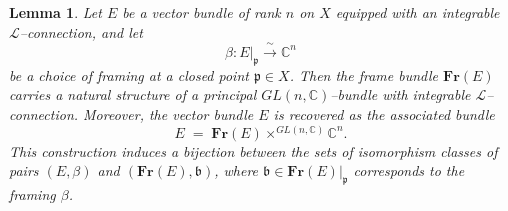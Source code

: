 \documentclass[12pt,reqno]{amsart}
\numberwithin{equation}{subsection}
\newtheorem{lem}[equation]{Lemma}
\theoremstyle{definition}
\theoremstyle{theorem}
\begin{document}
\begin{lem}\label{lem:Fr-bundle-induce-L-connection}
	Let $E$ be a vector bundle of rank $n$ on $X$ equipped with an integrable
	$\mathcal{L}$--connection, and let
	\[
	\beta \colon E|_{\mathfrak{p}} \xrightarrow{\;\sim\;} \mathbb{C}^{n}
	\]
	be a choice of framing at a closed point $\mathfrak{p} \in X$.
	Then the frame bundle $\mathbf{Fr}(E)$ carries a natural structure of a
	principal $GL(n,\mathbb{C})$--bundle with integrable $\mathcal{L}$--connection.
	Moreover, the vector bundle $E$ is recovered as the associated bundle
	\[
	E \;=\; \mathbf{Fr}(E) \times^{GL(n,\mathbb{C})} \mathbb{C}^{n}.
	\]
	This construction induces a bijection between the sets of isomorphism classes
	of pairs $(E,\beta)$ and $(\mathbf{Fr}(E),\mathfrak{b})$, where
	$\mathfrak{b} \in \mathbf{Fr}(E)|_{\mathfrak{p}}$ corresponds to the
	framing $\beta$.
\end{lem}
\end{document}
